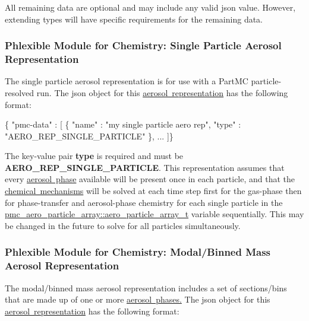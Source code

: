 All remaining data are optional and may include any valid {\ttfamily json} value. However, extending types will have specific requirements for the remaining data. \hypertarget{phlex_aero_rep_single_particle}{}\subsubsection{Phlexible Module for Chemistry\+: Single Particle Aerosol Representation}\label{phlex_aero_rep_single_particle}
The single particle aerosol representation is for use with a Part\+MC particle-\/resolved run. The {\ttfamily json} object for this \mbox{\hyperlink{phlex_aero_rep}{aerosol representation}} has the following format\+:


\begin{DoxyCode}
\{ "pmc-data" : [
  \{
    "name" : "my single particle aero rep",
    "type" : "AERO\_REP\_SINGLE\_PARTICLE"
  \},
  ...
]\}
\end{DoxyCode}
 The key-\/value pair {\bfseries type} is required and must be {\bfseries A\+E\+R\+O\+\_\+\+R\+E\+P\+\_\+\+S\+I\+N\+G\+L\+E\+\_\+\+P\+A\+R\+T\+I\+C\+LE}. This representation assumes that every \mbox{\hyperlink{input_format_aero_phase}{aerosol phase}} available will be present once in each particle, and that the \mbox{\hyperlink{input_format_mechanism}{chemical mechanisms}} will be solved at each time step first for the gas-\/phase then for phase-\/transfer and aerosol-\/phase chemistry for each single particle in the {\ttfamily \mbox{\hyperlink{structpmc__aero__particle__array_1_1aero__particle__array__t}{pmc\+\_\+aero\+\_\+particle\+\_\+array\+::aero\+\_\+particle\+\_\+array\+\_\+t}}} variable sequentially. This may be changed in the future to solve for all particles simultaneously. \hypertarget{phlex_aero_rep_modal_binned_mass}{}\subsubsection{Phlexible Module for Chemistry\+: Modal/\+Binned Mass Aerosol Representation}\label{phlex_aero_rep_modal_binned_mass}
The modal/binned mass aerosol representation includes a set of sections/bins that are made up of one or more \mbox{\hyperlink{phlex_aero_phase}{aerosol phases.}} The {\ttfamily json} object for this \mbox{\hyperlink{phlex_aero_rep}{aerosol representation}} has the following format\+:


